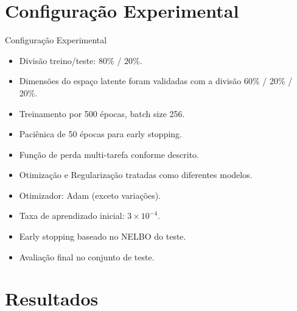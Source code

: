 \documentclass[10pt,aspectratio=169]{beamer}
\begin{document}
\section{Configuração Experimental}

\begin{frame}{Configuração Experimental}
  \begin{itemize}
    \item Divisão treino/teste: 80\% / 20\%.
    \item Dimensões do espaço latente foram validadas com a divisão 60\% / 20\% / 20\%.
    \item Treinamento por 500 épocas, batch size 256.
    \item Paciênica de 50 épocas para early stopping.
    \item Função de perda multi-tarefa conforme descrito.
    \item Otimização e Regularização tratadas como diferentes modelos.
    \item Otimizador: Adam (exceto variações).
    \item Taxa de aprendizado inicial: \(3 \times 10^{-4}\).
    \item Early stopping baseado no NELBO do teste.
    \item Avaliação final no conjunto de teste.
  \end{itemize}
\end{frame}







\section{Resultados}
\end{document}
